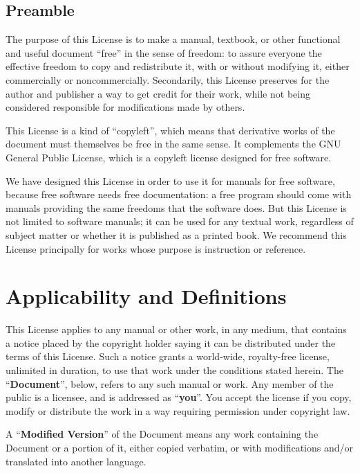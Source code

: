 \documentclass[12pt,a4paper,openany]{book}
\begin{document}
\subsection*{Preamble}

The purpose of this License is to make a manual, textbook, or other
functional and useful document “free” in the sense of freedom: to assure
everyone the effective freedom to copy and redistribute it, with or without
modifying it, either commercially or noncommercially.  Secondarily, this
License preserves for the author and publisher a way to get credit for
their work, while not being considered responsible for modifications made
by others.

This License is a kind of “copyleft”, which means that derivative works of
the document must themselves be free in the same sense.  It complements the
GNU General Public License, which is a copyleft license designed for free
software.

We have designed this License in order to use it for manuals for free
software, because free software needs free documentation: a free program
should come with manuals providing the same freedoms that the software
does.  But this License is not limited to software manuals; it can be used
for any textual work, regardless of subject matter or whether it is
published as a printed book.  We recommend this License principally for
works whose purpose is instruction or reference.

\section{Applicability and Definitions}
\label{FDL:sec1}

This License applies to any manual or other work, in any medium, that
contains a notice placed by the copyright holder saying it can be
distributed under the terms of this License.  Such a notice grants a
world-wide, royalty-free license, unlimited in duration, to use that work
under the conditions stated herein.  The “\textbf{Document}”, below,
refers to any such manual or work.  Any member of the public is a licensee,
and is addressed as “\textbf{you}”.  You accept the license if you copy,
modify or distribute the work in a way requiring permission under copyright
law.

A “\textbf{Modified Version}” of the Document means any work containing the
Document or a portion of it, either copied verbatim, or with modifications
and/or translated into another language.
\end{document}
